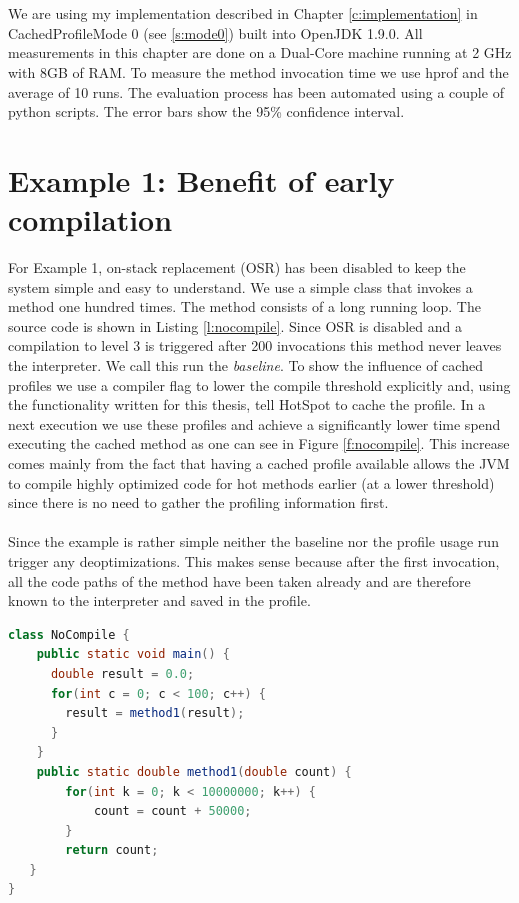 \\\\
We are using my implementation described in Chapter \ref{c:implementation} in CachedProfileMode 0 (see \ref{s:mode0}) built into OpenJDK 1.9.0.
All measurements in this chapter are done on a Dual-Core machine running at 2 GHz with 8GB of RAM. To measure the method invocation time we use hprof \cite{hprof} and the average of 10 runs. The evaluation process has been automated using a couple of python scripts. The error bars show the 95\% confidence interval.
\section{Example 1: Benefit of early compilation}
\label{s:ex1}
For Example 1, on-stack replacement (OSR) has been disabled to keep the system simple and easy to understand.
We use a simple class that invokes a method one hundred times. The method consists of a long running loop. The source code is shown in Listing \ref{l:nocompile}.
Since OSR is disabled and a compilation to level 3 is triggered after 200 invocations this method never leaves the interpreter. We call this run the \textit{baseline}.
To show the influence of cached profiles we use a compiler flag to lower the compile threshold explicitly and, using the functionality written for this thesis, tell HotSpot to cache the profile.
In a next execution we use these profiles and achieve a significantly lower time spend executing the cached method as one can see in Figure \ref{f:nocompile}.
This increase comes mainly from the fact that having a cached profile available allows the JVM to compile highly optimized code for hot methods earlier (at a lower threshold) since there is no need to gather the profiling information first.
\\\\
Since the example is rather simple neither the baseline nor the profile usage run trigger any deoptimizations. This makes sense because after the first invocation, all the code paths of the method have been taken already and are therefore known to the interpreter and saved in the profile.
\begin{lstlisting}[float,caption=Simple method that does not get compiled,label=l:nocompile,language=Java]
class NoCompile {
    public static void main() {
      double result = 0.0;
      for(int c = 0; c < 100; c++) {
        result = method1(result);
      }
    }
    public static double method1(double count) {
        for(int k = 0; k < 10000000; k++) {
            count = count + 50000;
        }
        return count;
   }
}
\end{lstlisting}
